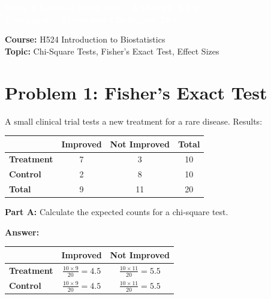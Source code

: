 \documentclass[11pt]{article}
\title{}
\author{}
\date{}
\begin{document}
\begin{tcolorbox}[colback=osaorange,colframe=black,boxrule=2pt,arc=0pt,left=6pt,right=6pt,top=10pt,bottom=10pt]
\centering
\textcolor{white}{\textbf{\Large Week 8 In-Class Worksheet - ANSWER KEY}}\\
\textcolor{white}{\textbf{\large Contingency Tables and Chi-Square Tests}}
\end{tcolorbox}

\vspace{8pt}

\noindent\textbf{Course:} H524 Introduction to Biostatistics\\
\textbf{Topic:} Chi-Square Tests, Fisher's Exact Test, Effect Sizes

\vspace{8pt}

\section{Problem 1: Fisher's Exact Test}

A small clinical trial tests a new treatment for a rare disease. Results:

\begin{center}
\begin{tabular}{l|cc|c}
& \textbf{Improved} & \textbf{Not Improved} & \textbf{Total} \\
\hline
\textbf{Treatment} & 7 & 3 & 10 \\
\textbf{Control} & 2 & 8 & 10 \\
\hline
\textbf{Total} & 9 & 11 & 20 \\
\end{tabular}
\end{center}

\vspace{6pt}

\textbf{Part A:} Calculate the expected counts for a chi-square test.

\vspace{0.3cm}

\textbf{Answer:}

\begin{tabular}{l|cc}
& \textbf{Improved} & \textbf{Not Improved} \\
\hline
\textbf{Treatment} & $\frac{10 \times 9}{20} = 4.5$ & $\frac{10 \times 11}{20} = 5.5$ \\[0.3cm]
\textbf{Control} & $\frac{10 \times 9}{20} = 4.5$ & $\frac{10 \times 11}{20} = 5.5$ \\
\end{tabular}
\end{document}
